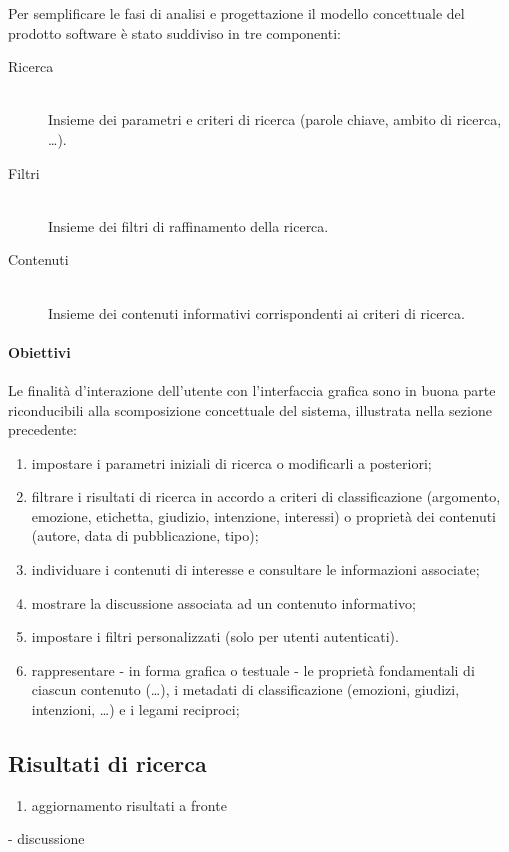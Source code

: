 Per semplificare le fasi di analisi e progettazione il modello concettuale del prodotto software è stato suddiviso in tre componenti:
\begin{description}
 	\item[Ricerca] \hfill \\
 	Insieme dei parametri e criteri di ricerca (parole chiave, ambito di ricerca, \ldots).
 	\item[Filtri] \hfill \\
 	Insieme dei filtri di raffinamento della ricerca.
 	\item[Contenuti] \hfill \\
 	Insieme dei contenuti informativi corrispondenti ai criteri di ricerca.
 \end{description}
 
\paragraph{Obiettivi}
Le finalità d'interazione dell'utente con l'interfaccia grafica sono in buona parte riconducibili alla scomposizione concettuale del sistema, illustrata nella sezione precedente:
\begin{enumerate}
	\item impostare i parametri iniziali di ricerca o modificarli a posteriori;
	\item filtrare i risultati di ricerca in accordo a criteri di classificazione (argomento, emozione, etichetta, giudizio, intenzione, interessi) o proprietà dei contenuti (autore, data di pubblicazione, tipo);
	\item individuare i contenuti di interesse e consultare le informazioni associate;
	\item mostrare la discussione associata ad un contenuto informativo;
	\item impostare i filtri personalizzati (solo per utenti autenticati).
	\item rappresentare - in forma grafica o testuale - le proprietà fondamentali di ciascun contenuto (\ldots), i metadati di classificazione (emozioni, giudizi, intenzioni, \ldots) e i legami reciproci;
\end{enumerate}
 
\subsection{Risultati di ricerca}
\begin{enumerate}
	\item aggiornamento risultati a fronte
\end{enumerate}
- discussione
